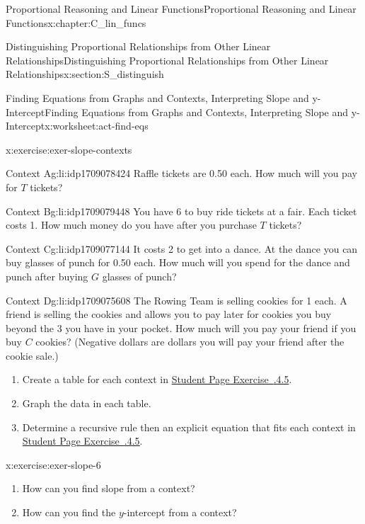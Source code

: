 \documentclass[oneside,10pt,]{book}
\newcommand{\xreffont}{\relax}
\numberwithin{equation}{chapter}
\begin{document}
\begin{chapterptx}{Proportional Reasoning and Linear Functions}{}{Proportional Reasoning and Linear Functions}{}{}{x:chapter:C_lin_funcs}
\begin{sectionptx}{Distinguishing Proportional Relationships from Other Linear Relationships}{}{Distinguishing Proportional Relationships from Other Linear Relationships}{}{}{x:section:S_distinguish}
\begin{worksheet-subsection}{Finding Equations from Graphs and Contexts, Interpreting Slope and y-Intercept}{}{Finding Equations from Graphs and Contexts, Interpreting Slope and y-Intercept}{}{}{x:worksheet:act-find-eqs}
\begin{divisionexercise}{5}{}{}{x:exercise:exer-slope-contexts}
\begin{descriptionlist}
\begin{dlimedium}{Context A}{g:li:idp1709078424}%
Raffle tickets are \textdollar{}0.50 each. How much will you pay for \(T\) tickets?%
\end{dlimedium}%
\begin{dlimedium}{Context B}{g:li:idp1709079448}%
You have \textdollar{}6 to buy ride tickets at a fair. Each ticket costs \textdollar{}1. How much money do you have after you purchase \(T\) tickets?%
\end{dlimedium}%
\begin{dlimedium}{Context C}{g:li:idp1709077144}%
It costs \textdollar{}2 to get into a dance. At the dance you can buy glasses of punch for \textdollar{}0.50 each. How much will you spend for the dance and punch after buying \(G\) glasses of punch?%
\end{dlimedium}%
\begin{dlimedium}{Context D}{g:li:idp1709075608}%
The Rowing Team is selling cookies for \textdollar{}1 each. A friend is selling the cookies and allows you to pay later for cookies you buy beyond the \textdollar{}3 you have in your pocket. How much will you pay your friend if you buy \(C\) cookies? (Negative dollars are dollars you will pay your friend after the cookie sale.)%
\end{dlimedium}%
\end{descriptionlist}
%
\begin{enumerate}[font=\bfseries,label=(\alph*),ref=\alph*]
\item{}Create a table for each context in \hyperlink{x:exercise:exer-slope-contexts}{Student Page Exercise~{\xreffont 2.6.4.5}}.%
\item{}Graph the data in each table.%
\item{}Determine a recursive rule then an explicit equation that fits each context in \hyperlink{x:exercise:exer-slope-contexts}{Student Page Exercise~{\xreffont 2.6.4.5}}.%
\end{enumerate}
\end{divisionexercise}%
\begin{divisionexercise}{6}{}{}{x:exercise:exer-slope-6}%
\begin{enumerate}[font=\bfseries,label=(\alph*),ref=\alph*]
\item{}How can you find slope from a context?%
\item{}How can you find the \(y\)-intercept from a context?%

\end{enumerate}
\end{divisionexercise}
\end{worksheet-subsection}
\end{sectionptx}
\end{chapterptx}
\end{document}
